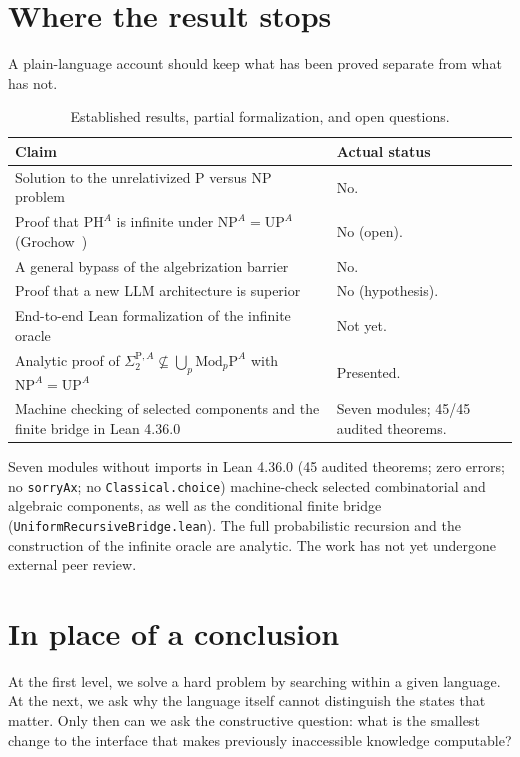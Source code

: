 \documentclass[11pt,a4paper]{article}
\newcommand{\NP}{\mathrm{NP}}
\newcommand{\UP}{\mathrm{UP}}
\newcommand{\MP}[1]{\mathrm{Mod}_{#1}\mathrm P}
\newcommand{\Sig}{\Sigma_2^{\mathrm P,A}}
\begin{document}
\section{Where the result stops}
A plain-language account should keep what has been proved separate from what has not.

\begin{table}[htbp]\small\centering
\begin{tabularx}{\linewidth}{@{}>{\raggedright\arraybackslash}p{.63\linewidth} >{\raggedright\arraybackslash}X@{}}
\toprule Claim & Actual status\\\midrule
Solution to the unrelativized P versus NP problem~\cite{cook} & No.\\
Proof that \(\mathrm{PH}^A\) is infinite under \(\NP^A=\UP^A\) (Grochow~\cite{grochow}) & No (open).\\
A general bypass of the algebrization barrier & No.\\
Proof that a new LLM architecture is superior & No (hypothesis).\\
End-to-end Lean formalization of the infinite oracle & Not yet.\\
Analytic proof of \(\Sig\not\subseteq\bigcup_p\MP p^A\) with \(\NP^A=\UP^A\) & Presented.\\
Machine checking of selected components and the finite bridge in Lean 4.36.0 & Seven modules; 45/45 audited theorems.\\
\bottomrule
\end{tabularx}
\caption{Established results, partial formalization, and open questions.}
\end{table}

Seven modules without imports in Lean 4.36.0 (45 audited theorems; zero errors; no \texttt{sorryAx}; no \texttt{Classical.choice}) machine-check selected combinatorial and algebraic components, as well as the conditional finite bridge (\texttt{UniformRecursiveBridge.lean}). The full probabilistic recursion and the construction of the infinite oracle are analytic. The work has not yet undergone external peer review.

\section{In place of a conclusion}
At the first level, we solve a hard problem by searching within a given language. At the next, we ask why the language itself cannot distinguish the states that matter. Only then can we ask the constructive question: what is the smallest change to the interface that makes previously inaccessible knowledge computable?
\end{document}
